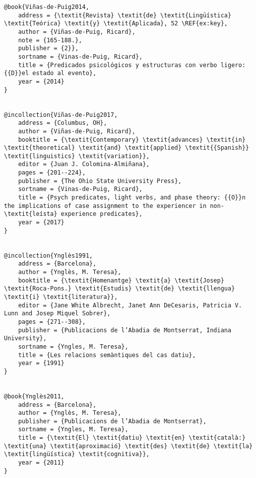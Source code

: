 \documentclass[output=paper,modfonts,nonflat]{langsci/langscibook}
\begin{document}
\begin{verbatim}
@book{Viñas-de-Puig2014,
	address = {\textit{Revista} \textit{de} \textit{Lingüística} \textit{Teórica} \textit{y} \textit{Aplicada}, 52 \REF{ex:key},
	author = {Viñas-de-Puig, Ricard},
	note = {165-188.},
	publisher = {2}},
	sortname = {Vinas-de-Puig, Ricard},
	title = {Predicados psicológicos y estructuras con verbo ligero: {{D}}el estado al evento},
	year = {2014}
}


@incollection{Viñas-de-Puig2017,
	address = {Columbus, OH},
	author = {Viñas-de-Puig, Ricard},
	booktitle = {\textit{Contemporary} \textit{advances} \textit{in} \textit{theoretical} \textit{and} \textit{applied} \textit{{Spanish}} \textit{linguistics} \textit{variation}},
	editor = {Juan J. Colomina-Almiñana},
	pages = {201--224},
	publisher = {The Ohio State University Press},
	sortname = {Vinas-de-Puig, Ricard},
	title = {Psych predicates, light verbs, and phase theory: {{O}}n the implications of case assignment to the experiencer in non-\textit{leísta} experience predicates},
	year = {2017}
}


@incollection{Ynglès1991,
	address = {Barcelona},
	author = {Ynglès, M. Teresa},
	booktitle = {\textit{Homenantge} \textit{a} \textit{Josep} \textit{Roca-Pons.} \textit{Estudis} \textit{de} \textit{llengua} \textit{i} \textit{literatura}},
	editor = {Jane White Albrecht, Janet Ann DeCesaris, Patricia V. Lunn and Josep Miquel Sobrer},
	pages = {271--308},
	publisher = {Publicacions de l’Abadia de Montserrat, Indiana University},
	sortname = {Yngles, M. Teresa},
	title = {Les relacions semàntiques del cas datiu},
	year = {1991}
}


@book{Ynglès2011,
	address = {Barcelona},
	author = {Ynglès, M. Teresa},
	publisher = {Publicacions de l’Abadia de Montserrat},
	sortname = {Yngles, M. Teresa},
	title = {\textit{El} \textit{datiu} \textit{en} \textit{català:} \textit{una} \textit{aproximació} \textit{des} \textit{de} \textit{la} \textit{lingüística} \textit{cognitiva}},
	year = {2011}
}


\end{verbatim}
\sloppy\printbibliography[heading=subbibliography,notkeyword=this]
\end{document}
